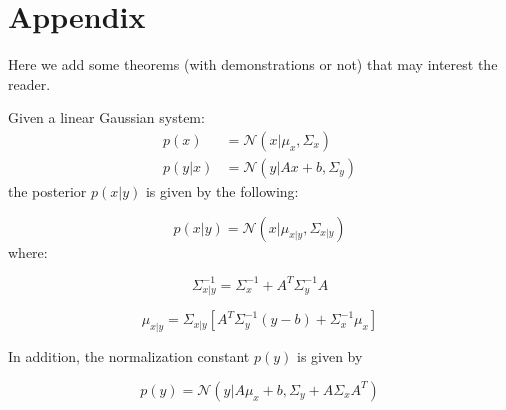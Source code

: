\section{Appendix}
Here we add some theorems (with demonstrations or not) that may interest the reader.

\begin{theorem}
\label{thm:bayes-rule-lin-gaussian-sys}

Given a linear Gaussian system:
\begin{equation}
\boxed{
\begin{aligned}
p(x) &= \mathcal{N} (x | \mu_x , \Sigma_x) \\
p(y | x) &= \mathcal{N} (y | Ax + b, \Sigma_y)
\end{aligned}
}
\end{equation}
the posterior $p(x|y)$ is given by the following:

\begin{equation}
p(x | y) = \mathcal{N} \left( x | \mu_{x | y}, \Sigma_{x | y} \right)
\end{equation}
where:

\begin{equation}
\Sigma_{x | y}^{-1} = \Sigma_x^{-1} + A^T \Sigma_y^{-1} A
\end{equation}

\begin{equation}
\mu_{x | y} = \Sigma_{x | y} \left[ A^T \Sigma_y^{-1} (y - b) + \Sigma_x^{-1} \mu_x \right]
\end{equation}

In addition, the normalization constant $p(y)$ is given by

\begin{equation}
p(y) = \mathcal{N} \left( y | A \mu_x + b, \Sigma_y + A \Sigma_x A^T \right)
\end{equation}
\end{theorem}

